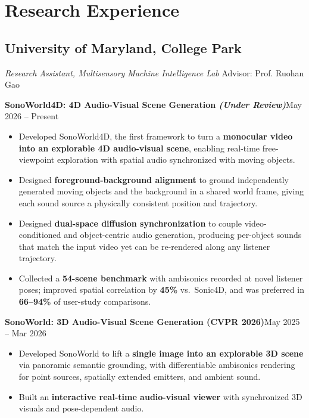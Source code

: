 \documentclass[11pt]{article}
\newcommand{\project}[2]{%
  \par\addvspace{7pt}\noindent\textbf{#1}\hfill{\small #2}\par\nopagebreak}
\newcommand{\oneitem}[1]{\item #1}
\newcommand{\twoitem}[2]{\item #1 #2}
\begin{document}
\section{Research Experience}
\subsection{\textbf{University of Maryland, College Park}}
\textit{Research Assistant, Multisensory Machine Intelligence Lab} \hfill Advisor: Prof. Ruohan Gao

\project{SonoWorld4D: 4D Audio-Visual Scene Generation {\normalfont\small\textit{(Under Review)}}}{May 2026 -- Present}
\begin{itemize}
\item Developed SonoWorld4D, the first framework to turn a \textbf{monocular video into an explorable 4D audio-visual scene}, enabling real-time free-viewpoint exploration with spatial audio synchronized with moving objects.
\item Designed \textbf{foreground-background alignment} to ground independently generated moving objects and the background in a shared world frame, giving each sound source a physically consistent position and trajectory.
\item Designed \textbf{dual-space diffusion synchronization} to couple video-conditioned and object-centric audio generation, producing per-object sounds that match the input video yet can be re-rendered along any listener trajectory.
\item Collected a \textbf{54-scene benchmark} with ambisonics recorded at novel listener poses; improved spatial correlation by \textbf{45\%} vs.\ Sonic4D, and was preferred in \textbf{66--94\%} of user-study comparisons.
\end{itemize}

\project{SonoWorld: 3D Audio-Visual Scene Generation (CVPR 2026)}{May 2025 -- Mar 2026}
\begin{itemize}
\item Developed SonoWorld to lift a \textbf{single image into an explorable 3D scene} via panoramic semantic grounding, with differentiable ambisonics rendering for point sources, spatially extended emitters, and ambient sound.
\oneitem{Built an \textbf{interactive real-time audio-visual viewer} with synchronized 3D visuals and pose-dependent audio.}
\end{itemize}
\end{document}
